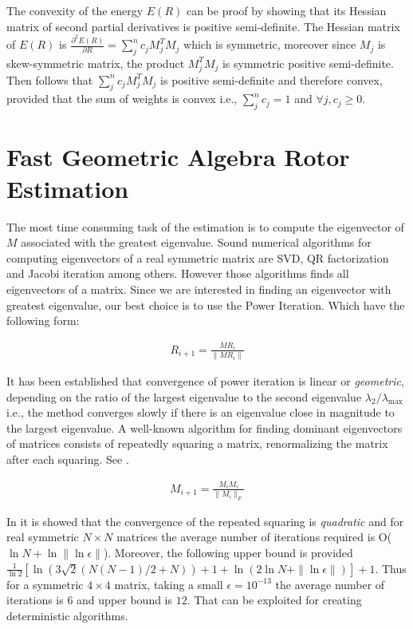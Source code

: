 \documentclass{birkjour}
\numberwithin{equation}{section}
\begin{document}
The convexity of the energy $E(R)$ can be proof by showing that its Hessian matrix of second partial derivatives is positive semi-definite. The Hessian matrix of $E(R)$ is $\frac{\partial^2 E(R)}{\partial R} = \sum_j^n { c_j M_j^T M_j}$ which is symmetric, moreover since $M_j$ is skew-symmetric matrix, the product $M_j^T M_j$ is symmetric positive semi-definite. Then follows that $\sum_j^n { c_j M_j^T M_j}$ is positive semi-definite and therefore convex, provided that the sum of weights is convex i.e., $\sum_j^n { c_j } = 1$ and $\forall j, c_j \geq 0$.

\section{Fast Geometric Algebra Rotor Estimation}

The most time consuming task of the estimation is to compute the eigenvector of $M$ associated with the greatest eigenvalue. Sound numerical algorithms for computing eigenvectors of a real symmetric matrix are SVD, QR factorization and Jacobi iteration among others. However those algorithms finds all eigenvectors of a matrix. Since we are interested in finding an eigenvector with greatest eigenvalue, our best choice is to use the Power Iteration. Which have the following form:

\begin{eqnarray*}
R_{i+1} = \frac{M R_i}{\| M R_i \|}
\end{eqnarray*}

It has been established that convergence of power iteration is linear or \emph{geometric}, depending on the ratio of the largest eigenvalue to the second eigenvalue $\lambda_2 / \lambda_{\max}$ i.e., the method converges slowly if there is an eigenvalue close in magnitude to the largest eigenvalue. A well-known algorithm for finding dominant eigenvectors of matrices consists of repeatedly squaring a matrix, renormalizing the matrix after each squaring. See \cite{Wilkinson1988}.

\begin{eqnarray*}
	M_{i+1} = \frac{M_i M_i}{\| M_i \|_F}
\end{eqnarray*}

In \cite{Kostlan1991} it is showed that the convergence of the repeated squaring is \emph{quadratic} and for real symmetric $N \times N$ matrices the average number of iterations required is O($\ln N + \ln \|\ln \epsilon\|$). Moreover, the following upper bound is provided $\frac{1}{\ln 2} [ \ln( 3 \sqrt{2} ( N ( N - 1 ) / 2 + N ) ) + 1 + \ln( 2 \ln N + \|\ln \epsilon\|) ] + 1$. Thus for a symmetric $4 \times 4$ matrix, taking a small $\epsilon = 10^{-13}$ the average number of iterations is $6$ and upper bound is $12$. That can be exploited for creating deterministic algorithms.
\end{document}
